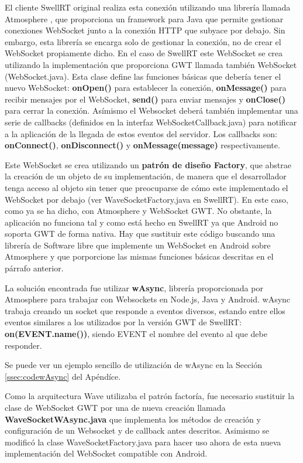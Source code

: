     El cliente SwellRT original realiza esta conexión utilizando una librería llamada Atmosphere \cite{ref:atmosphere}, que proporciona un framework para Java que permite gestionar conexiones WebSocket junto a la conexión HTTP que subyace por debajo. Sin embargo, esta librería se encarga solo de gestionar la conexión, no de crear el WebSocket propiamente dicho. En el caso de SwellRT este WebSocket se crea utilizando la implementación que proporciona GWT llamada también WebSocket (WebSocket.java). Esta clase define las funciones básicas que debería tener el nuevo WebSocket: \textbf{onOpen()} para establecer la conexión, \textbf{onMessage()} para recibir mensajes por el WebSocket, \textbf{send()} para enviar mensajes y \textbf{onClose()} para cerrar la conexión. Asímismo el Websocket deberá también implementar una serie de callbacks (definidos en la interfaz WebSocketCallback.java) para notificar a la aplicación de la llegada de estos eventos del servidor. Los callbacks son: \textbf{onConnect()}, \textbf{onDisconnect()} y \textbf{onMessage(message)} respectivamente.
	
	Este WebSocket se crea utilizando un \textbf{patrón de diseño Factory}, que abstrae la creación de un objeto de su implementación, de manera que el desarrollador tenga acceso al objeto sin tener que preocuparse de cómo este implementado el WebSocket por debajo (ver WaveSocketFactory.java en SwellRT). En este caso, como ya se ha dicho, con Atmosphere y WebSocket GWT. No obstante, la aplicación no funciona tal y como está hecho en SwellRT ya que Android no soporta GWT de forma nativa. Hay que sustituir este código buscando una librería de Software libre que implemente un WebSocket en Android sobre Atmosphere y que porporcione las mismas funciones básicas descritas en el párrafo anterior.
	
	La solución encontrada fue utilizar \textbf{wAsync}\cite{ref:wAsync_github}, librería proporcionada por Atmosphere para trabajar con Websockets en Node.js, Java y Android. wAsync trabaja creando un socket que responde a eventos diversos, estando entre ellos eventos similares a los utilizados por la versión GWT de SwellRT: \textbf{on(EVENT.name())}, siendo EVENT el nombre del evento al que debe responder. 
	
	Se puede ver un ejemplo sencillo de utilización de wAsync en la Sección \ref{ssec:codewAsync} del Apéndíce.
	
	Como la arquitectura Wave utilizaba el patrón factoría, fue necesario sustituir la clase de WebSocket GWT por una de nueva creación llamada \textbf{WaveSocketWAsync.java}\cite{ref:wave_migration_github} que implementa los métodos de creación y configuración de un Websocket y de callback antes descritos. Asimismo se modificó la clase WaveSocketFactory.java para hacer uso ahora de esta nueva implementación del WebSocket compatible con Android. 
	
